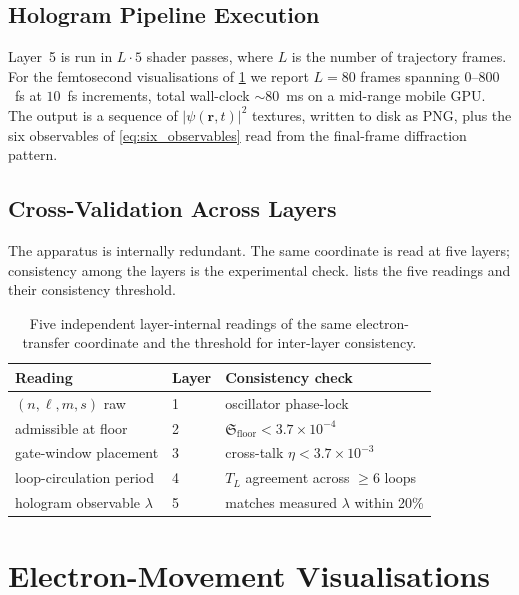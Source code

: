 \documentclass[11pt,twocolumn,a4paper]{article}
\theoremstyle{definition}
\theoremstyle{remark}
\newcommand{\Floor}{\mathfrak{S}_{\mathrm{floor}}}
\begin{document}
\subsection{Hologram Pipeline Execution}
\label{sec:pipeline_run}

Layer~5 is run in $L \cdot 5$ shader passes, where $L$ is the number of
trajectory frames. For the femtosecond visualisations of
\cref{sec:visualisations} we report $L = 80$ frames spanning
$0$--$800$~fs at $10$~fs increments, total wall-clock $\sim 80$~ms on a
mid-range mobile GPU. The output is a sequence of $|\psi(\mathbf{r}, t)|^2$
textures, written to disk as PNG, plus the six observables of
\cref{eq:six_observables} read from the final-frame diffraction pattern.

\subsection{Cross-Validation Across Layers}
\label{sec:cross_validation}

The apparatus is internally redundant. The same coordinate is read at
five layers; consistency among the layers is the experimental check.
 lists the five readings and their consistency
threshold.

\begin{table}[!h]
\centering\small
\begin{tabular}{lll}
\toprule
\textbf{Reading} & \textbf{Layer} & \textbf{Consistency check} \\
\midrule
$(n, \ell, m, s)$ raw      & 1 & oscillator phase-lock           \\
admissible at floor        & 2 & $\Floor < 3.7 \times 10^{-4}$   \\
gate-window placement      & 3 & cross-talk $\eta < 3.7 \times 10^{-3}$ \\
loop-circulation period    & 4 & $T_L$ agreement across $\geq 6$ loops \\
hologram observable $\lambda$ & 5 & matches measured $\lambda$ within 20\% \\
\bottomrule
\end{tabular}
\caption{Five independent layer-internal readings of the same electron-transfer
coordinate and the threshold for inter-layer consistency.}
\label{tab:cross_validation}
\end{table}

\section{Electron-Movement Visualisations}
\label{sec:visualisations}
\end{document}
